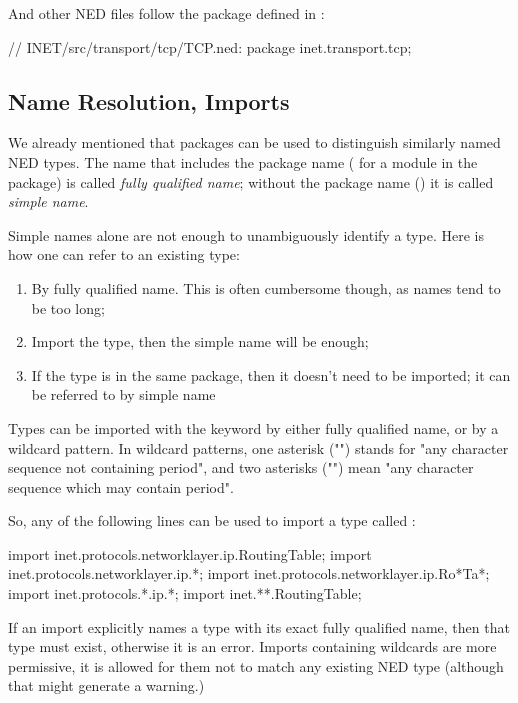 And other NED files follow the package defined in :

\begin{ned}
// INET/src/transport/tcp/TCP.ned:
package inet.transport.tcp;
\end{ned}


\subsection{Name Resolution, Imports}
\label{sec:ned-lang:imports-and-name-resolution}

We already mentioned that packages can be used to distinguish
similarly named NED types. The name that includes the package name
( for a  module in the 
package) is called \textit{fully qualified name}; without the package
name () it is called \textit{simple name}.

Simple names alone are not enough to unambiguously identify a type.
Here is how one can refer to an existing type:

\begin{enumerate}
  \item By fully qualified name. This is often cumbersome though,
        as names tend to be too long;
  \item Import the type, then the simple name will be enough;
  \item If the type is in the same package, then it doesn't need to be
        imported; it can be referred to by simple name
\end{enumerate}

Types can be imported with the  keyword by either
fully qualified name, or by a wildcard pattern. In wildcard patterns,
one asterisk ("\ttt{*}") stands for "any character sequence not containing
period", and two asterisks ("\ttt{**}") mean "any character sequence which may
contain period".

So, any of the following lines can be used to import a type called
:

\begin{ned}
import inet.protocols.networklayer.ip.RoutingTable;
import inet.protocols.networklayer.ip.*;
import inet.protocols.networklayer.ip.Ro*Ta*;
import inet.protocols.*.ip.*;
import inet.**.RoutingTable;
\end{ned}

If an import explicitly names a type with its exact fully qualified name,
then that type must exist, otherwise it is an error. Imports containing
wildcards are more permissive, it is allowed for them not to match any
existing NED type (although that might generate a warning.)

